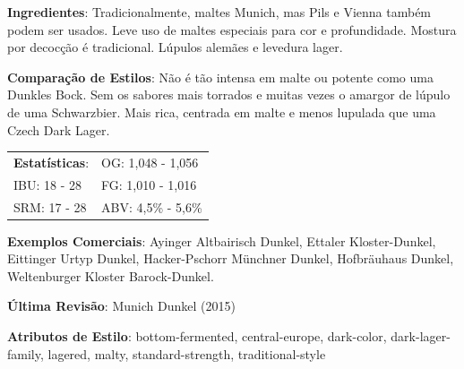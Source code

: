 \textbf{Ingredientes}: Tradicionalmente, maltes Munich, mas Pils e Vienna também podem ser usados. Leve uso de maltes especiais para cor e profundidade. Mostura por decocção é tradicional. Lúpulos alemães e levedura lager.

\textbf{Comparação de Estilos}: Não é tão intensa em malte ou potente como uma Dunkles Bock. Sem os sabores mais torrados e muitas vezes o amargor de lúpulo de uma Schwarzbier. Mais rica, centrada em malte e menos lupulada que uma Czech Dark Lager.

\begin{tabular}{@{}p{35mm}p{35mm}@{}}
  \textbf{Estatísticas}: & OG: 1,048 - 1,056 \\
  IBU: 18 - 28 & FG: 1,010 - 1,016 \\
  SRM: 17 - 28 & ABV: 4,5\% - 5,6\%
\end{tabular}

\textbf{Exemplos Comerciais}: Ayinger Altbairisch Dunkel, Ettaler Kloster-Dunkel, Eittinger Urtyp Dunkel, Hacker-Pschorr Münchner Dunkel, Hofbräuhaus Dunkel, Weltenburger Kloster Barock-Dunkel.

\textbf{Última Revisão}: Munich Dunkel (2015)

\textbf{Atributos de Estilo}: bottom-fermented, central-europe, dark-color, dark-lager-family, lagered, malty, standard-strength, traditional-style
